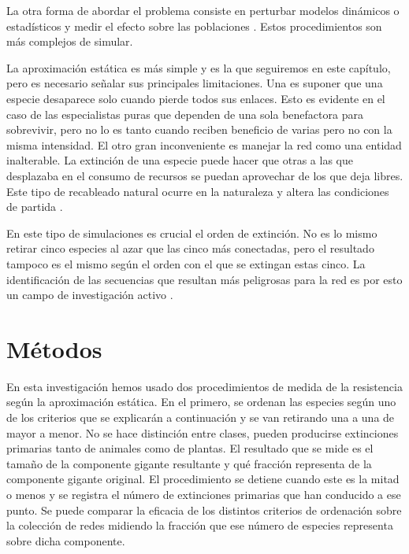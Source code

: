 La otra forma de abordar el problema consiste en perturbar modelos dinámicos o estadísticos y medir el efecto sobre las poblaciones \cite{thebault2010stability, saavedra2013estimating, suweis2013emergence}. Estos procedimientos son más complejos de simular.

La aproximación estática es más simple y es la que seguiremos en este capítulo, pero es necesario señalar sus principales limitaciones. Una es suponer que una especie desaparece solo cuando pierde todos sus enlaces. Esto es evidente en el caso de las especialistas puras que dependen de una sola benefactora para sobrevivir, pero no lo es tanto cuando reciben beneficio de varias pero no con la misma intensidad. El otro gran inconveniente es manejar la red como una entidad inalterable. La extinción de una especie puede hacer que otras a las que desplazaba en el consumo de recursos se puedan aprovechar de los que deja libres. Este tipo de recableado natural ocurre en la naturaleza y altera las condiciones de partida \cite{ramos2012topological, goldsteinif}.

En este tipo de simulaciones es crucial el orden de extinción. No es lo mismo retirar cinco especies al azar que las cinco más conectadas, pero el resultado tampoco es el mismo según el orden con el que se extingan estas cinco. La identificación de las secuencias que resultan más peligrosas para la red es por esto un campo de investigación activo \cite{allesina2009googling, dominguez2015ranking}.

\section{Métodos}

En esta investigación hemos usado dos procedimientos de medida de la resistencia según la aproximación estática. En el primero, se ordenan las especies según uno de los criterios que se explicarán a continuación y se van retirando una a una de mayor a menor. No se hace distinción entre clases, pueden producirse extinciones primarias tanto de animales como de plantas. El resultado que se mide es el tamaño de la componente gigante resultante y qué fracción representa de la componente gigante original. El procedimiento se detiene cuando este es la mitad o menos y se registra el número de extinciones primarias que han conducido a ese punto. Se puede comparar la eficacia de los distintos criterios de ordenación sobre la colección de redes midiendo la fracción que ese número de especies representa sobre dicha componente.

